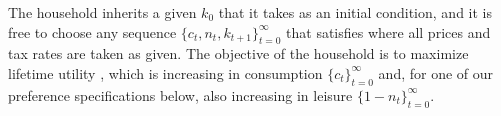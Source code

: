 The household inherits a given $k_0$ that it takes as an
initial condition, and it is free to choose any sequence
$\{c_t, n_t, k_{t+1}\}_{t=0}^\infty$ that satisfies 
where all prices and tax rates are taken as given.
The objective of the household is to maximize lifetime
utility , which is increasing in consumption
$\{c_t\}_{t=0}^\infty$ and,
for one of our preference specifications below, also
increasing in leisure $\{1 -n _t\}_{t=0}^\infty$.

